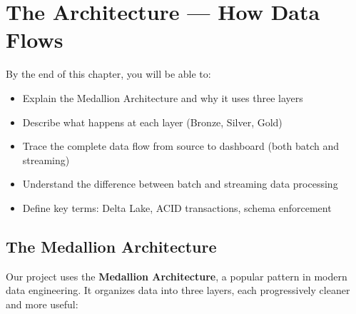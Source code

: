 \documentclass[12pt, a4paper, oneside]{report}
\begin{document}
\chapter{The Architecture --- How Data Flows}
\label{ch:architecture}

\begin{objectivebox}
By the end of this chapter, you will be able to:
\begin{itemize}
    \item Explain the Medallion Architecture and why it uses three layers
    \item Describe what happens at each layer (Bronze, Silver, Gold)
    \item Trace the complete data flow from source to dashboard (both batch and streaming)
    \item Understand the difference between batch and streaming data processing
    \item Define key terms: Delta Lake, ACID transactions, schema enforcement
\end{itemize}
\end{objectivebox}

\section{The Medallion Architecture}

Our project uses the \textbf{Medallion Architecture}, a popular pattern in modern data engineering. It organizes data into three layers, each progressively cleaner and more useful:
\end{document}
